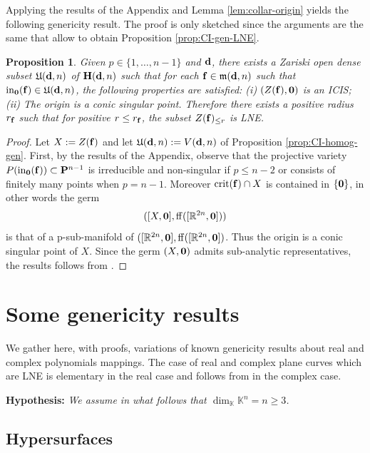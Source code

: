 \documentclass[11pt]{amsart}
\newtheorem{proposition}[theorem]{Proposition}
\newcommand{\field}[1]{\mathbb{#1}}
\newcommand{\K}{\field{K}}
\newcommand{\R}{\field{R}}
\newcommand{\bbo}{{\bf 0}}
\newcommand{\bd}{{\bf d}}
\newcommand{\bbf}{{\bf f}}
\newcommand{\bH}{{\bf H}}
\newcommand{\bP}{{\bf P}}
\newcommand{\crit}{{\rm crit}}
\newcommand{\ff}{{\rm ff}}
\newcommand{\ini}{{\rm in}}
\newcommand{\Kn}{{\K^n}}
\newcommand{\mfrk}{\mathfrak{m}}
\newcommand{\Ufrk}{\mathfrak{U}}
\numberwithin{equation}{section}
\numberwithin{equation}{section}
\begin{document}
\bigskip
Applying the results of the Appendix and Lemma 
\ref{lem:collar-origin} yields the 
following genericity result. The proof is only sketched 
since the arguments are the same that allow to
obtain Proposition \ref{prop:CI-gen-LNE}.
%
%
\begin{proposition}\label{prop:ICIS-germ-LNE}
Given $p  \in \{1, \ldots,n-1\}$ and $\bd$, there exists a Zariski open dense 
subset $\Ufrk(\bd,n)$ of $\bH(\bd,n)$ such that for each $\bbf \in 
\mfrk(\bd,n)$ such that $\ini_\bbo(\bbf)\in \Ufrk(\bd,n)$, the following properties are satisfied: 
(i) $(Z(\bbf),\bbo)$ is an ICIS; 
(ii) The origin is a conic singular point.
Therefore there exists a positive 
radius $r_\bbf$ such that for positive $r\leq r_\bbf$, the subset
$Z(\bbf)_{\leq r}$ is LNE.
\end{proposition}
%
%
\begin{proof}
Let $X := Z(\bbf)$ and let $\Ufrk(\bd,n) := V(\bd,n)$ of Proposition 
\ref{prop:CI-homog-gen}. 
First, by the results of the Appendix, observe that the projective 
variety $P(\ini_\bbo(\bbf))\subset \bP^{n-1}$ is irreducible and non-singular 
if $p\leq n-2$ or consists of finitely many points when $p=n-1$. Moreover 
$\crit(\bbf) \cap X$ is contained in $\{\bbo\}$, in other words
the germ 
$$
([X,\bbo],\ff ([\R^{2n},\bbo])) 
$$
is that of a p-sub-manifold of $([\R^{2n},\bbo],\ff ([\R^{2n},\bbo])$. Thus 
the origin is a conic singular point of $X$. Since the germ $(X,\bbo)$ admits 
sub-analytic representatives, the results follows from \cite[Corollary 4.6]{CoGrMi2}. 
\end{proof}
%
%
%
%
%
%
%
%
%
%
%
%
%
%
%
%
%
%
%
%
%
%
%
%
%
%
% 
%
%
%
%
%
%
%
%
%
%
%
%
%
%
%
%
%
%
%
%
\appendix
\section{Some genericity results}\label{section:appendix}
%
%
We gather here, with proofs, variations of known genericity results 
about real and complex polynomials mappings. 
The case of real and complex plane curves which are LNE is elementary 
in the real case and follows from \cite{Tar,CoGrMi1} in the complex case.

\medskip\noindent
{\bf Hypothesis:} \em We assume in what follows that $\dim_\K \Kn = n \geq 
3$. \em

\subsection{Hypersurfaces}\label{subsec:H}
$ $
\end{document}
